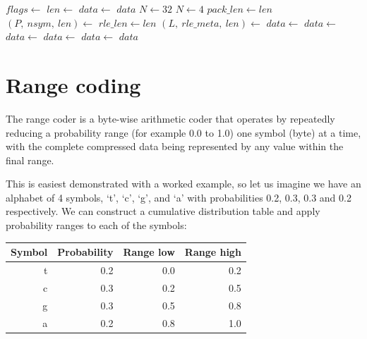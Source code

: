 \documentclass[a4paper]{article}
\begin{document}
\begin{algorithmic}[1]
  \State $flags \gets $
    \State $len \gets$
  \EndIf
    \State $data \gets $
    \State \Return $data$
  \EndIf
    \State $N \gets 32$
  \Else
    \State $N \gets 4$
  \EndIf
  \Statex {}
    \State $pack\_len \gets len$
    \State $(P,\ nsym,\ len) \gets $
  \EndIf
    \State $rle\_len \gets len$
    \State $(L,\ rle\_meta,\ len) \gets $
  \EndIf
  \Statex {}
    \State $data \gets $
    \State $data \gets $
  \Else
    \State $data \gets $
  \EndIf
  \Statex {}
    \State $data \gets $
  \EndIf
    \State $data \gets $
  \EndIf
  \State \Return $data$
  \EndFunction
\end{algorithmic}

\section{Range coding}

The range coder is a byte-wise arithmetic coder that operates by
repeatedly reducing a probability range (for example 0.0 to 1.0) one
symbol (byte) at a time, with the complete compressed data being
represented by any value within the final range.

This is easiest demonstrated with a worked example, so let us imagine
we have an alphabet of 4 symbols, `t', `c', `g', and `a' with
probabilities 0.2, 0.3, 0.3 and 0.2 respectively.  We can construct a
cumulative distribution table and apply probability ranges to each of
the symbols:

\begin{tabular}{rrrr}
\hline
\textbf{Symbol} & \textbf{Probability} & \textbf{Range low} & \textbf{Range high}\\
\hline
t & 0.2 & 0.0 & 0.2 \\
c & 0.3 & 0.2 & 0.5 \\
g & 0.3 & 0.5 & 0.8 \\
a & 0.2 & 0.8 & 1.0 \\
\hline
\end{tabular}
\end{document}
